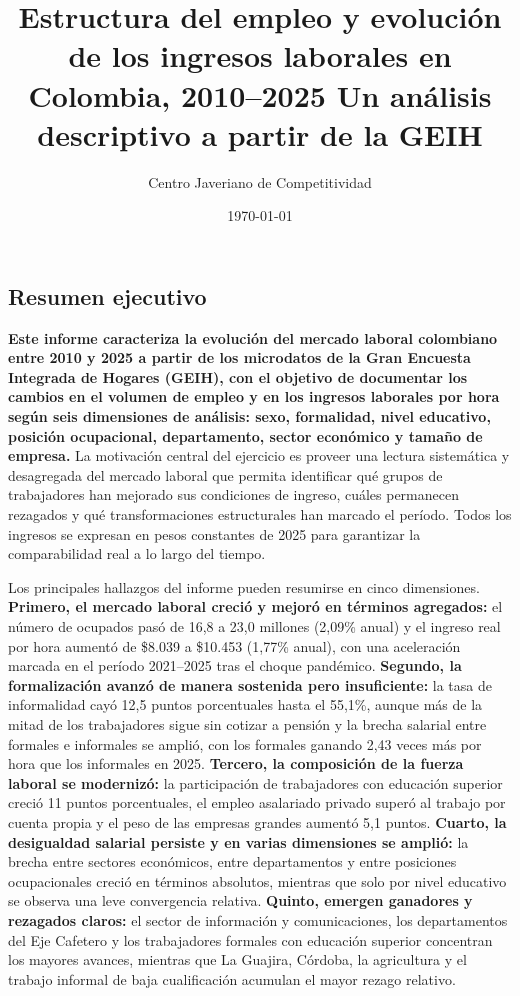 \documentclass[12pt, a4paper]{article}
\title{Estructura del empleo y evolución de los ingresos laborales en Colombia, 2010–2025
Un análisis descriptivo a partir de la GEIH}
\author{Centro Javeriano de Competitividad}
\date{\today}
\begin{document}
\maketitle
\begin{mdframed}[
  linewidth=1pt,
  linecolor=gray!60,
  backgroundcolor=gray!6,
  innertopmargin=12pt,
  innerbottommargin=12pt,
  innerleftmargin=14pt,
  innerrightmargin=14pt
]
\section*{Resumen ejecutivo}
\textbf{Este informe caracteriza la evolución del mercado laboral colombiano entre 2010 y 2025 a partir de los microdatos de la Gran Encuesta Integrada de Hogares (GEIH), con el objetivo de documentar los cambios en el volumen de empleo y en los ingresos laborales por hora según seis dimensiones de análisis: sexo, formalidad, nivel educativo, posición ocupacional, departamento, sector económico y tamaño de empresa.} La motivación central del ejercicio es proveer una lectura sistemática y desagregada del mercado laboral que permita identificar qué grupos de trabajadores han mejorado sus condiciones de ingreso, cuáles permanecen rezagados y qué transformaciones estructurales han marcado el período. Todos los ingresos se expresan en pesos constantes de 2025 para garantizar la comparabilidad real a lo largo del tiempo.

Los principales hallazgos del informe pueden resumirse en cinco dimensiones. \textbf{Primero, el mercado laboral creció y mejoró en términos agregados:} el número de ocupados pasó de 16,8 a 23,0 millones (2,09\% anual) y el ingreso real por hora aumentó de \$8.039 a \$10.453 (1,77\% anual), con una aceleración marcada en el período 2021--2025 tras el choque pandémico. \textbf{Segundo, la formalización avanzó de manera sostenida pero insuficiente:} la tasa de informalidad cayó 12,5 puntos porcentuales hasta el 55,1\%, aunque más de la mitad de los trabajadores sigue sin cotizar a pensión y la brecha salarial entre formales e informales se amplió, con los formales ganando 2,43 veces más por hora que los informales en 2025. \textbf{Tercero, la composición de la fuerza laboral se modernizó:} la participación de trabajadores con educación superior creció 11 puntos porcentuales, el empleo asalariado privado superó al trabajo por cuenta propia y el peso de las empresas grandes aumentó 5,1 puntos. \textbf{Cuarto, la desigualdad salarial persiste y en varias dimensiones se amplió:} la brecha entre sectores económicos, entre departamentos y entre posiciones ocupacionales creció en términos absolutos, mientras que solo por nivel educativo se observa una leve convergencia relativa. \textbf{Quinto, emergen ganadores y rezagados claros:} el sector de información y comunicaciones, los departamentos del Eje Cafetero y los trabajadores formales con educación superior concentran los mayores avances, mientras que La Guajira, Córdoba, la agricultura y el trabajo informal de baja cualificación acumulan el mayor rezago relativo.
\end{mdframed}







\end{document}
